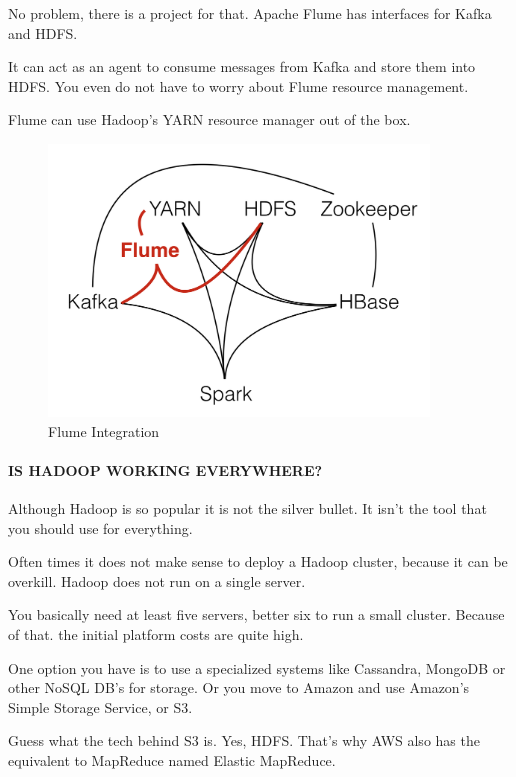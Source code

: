 \documentclass[12pt]{scrartcl} %
\begin{document}
No problem, there is a project for that. Apache Flume has interfaces for Kafka and HDFS.

It can act as an agent to consume messages from Kafka and store them into HDFS. You even do not have to worry about Flume resource management.

Flume can use Hadoop’s YARN resource manager out of the box.

\begin{figure}[htbp]
  \centering
     \includegraphics[width=0.9\textwidth]{images/Hadoop-Ecosystem-Connections-Flume.png}
  \caption{Flume Integration}
  \label{fig:Bild1}
\end{figure}



\paragraph{IS HADOOP WORKING EVERYWHERE?}

Although Hadoop is so popular it is not the silver bullet. It isn’t the tool that you should use for everything.

Often times it does not make sense to deploy a Hadoop cluster, because it can be overkill. Hadoop does not run on a single server.

You basically need at least five servers, better six to run a small cluster. Because of that. the initial platform costs are quite high.

One option you have is to use a specialized systems like Cassandra, MongoDB or other NoSQL DB’s for storage. Or you move to Amazon and use Amazon’s Simple Storage Service, or S3.

Guess what the tech behind S3 is. Yes, HDFS. That’s why AWS also has the equivalent to MapReduce named Elastic MapReduce.
\end{document}
